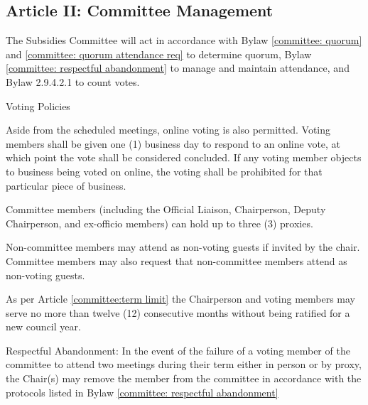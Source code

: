 \subsection{Article II: Committee Management}
\begin{longenum}[ label*=\thesubsection.\arabic*., align=left] 
	\item The Subsidies Committee will act in accordance with Bylaw \ref{committee: quorum} and \ref{committee: quorum attendance req} to determine quorum, Bylaw \ref{committee: respectful abandonment} to manage and maintain attendance, and Bylaw 2.9.4.2.1 to count votes.
	\item Voting Policies
		\begin{longenum}[ label*=\arabic*., align=left] 
		\item Aside from the scheduled meetings, online voting is also permitted. Voting members shall be given one (1) business day to respond to an online vote, at which point the vote shall be considered concluded. If any voting member objects to business being voted on online, the voting shall be prohibited for that particular piece of business.
		\item Committee members (including the Official Liaison, Chairperson, Deputy Chairperson, and ex-officio members) can hold up to three (3) proxies.
		\end{longenum}
	\item Non-committee members may attend as non-voting guests if invited by the chair. Committee members may also request that non-committee members attend as non-voting guests.
	\item As per Article \ref{committee:term limit} the Chairperson and voting members may serve no more than twelve (12) consecutive months without being ratified for a new council year.
	\item Respectful Abandonment: In the event of the failure of a voting member of the committee to attend two meetings during their term either in person or by proxy, the Chair(s) may remove the member from the committee in accordance with the protocols listed in Bylaw \ref{committee: respectful abandonment}
\end{longenum}

